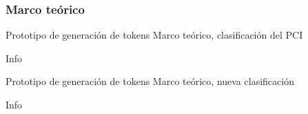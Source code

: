%
%
%

\subsubsection{Marco teórico}

\begin{frame}{Prototipo de generación de tokens}
{Marco teórico, clasificación del PCI}
  
  Info


\end{frame}

\begin{frame}{Prototipo de generación de tokens}
{Marco teórico, nueva clasificación}
  
  Info


\end{frame}
